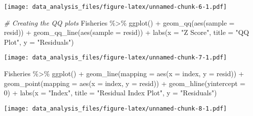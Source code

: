 \documentclass[
]{article}
\newenvironment{Shaded}{\begin{snugshade}}{\end{snugshade}}
\newcommand{\AttributeTok}[1]{\textcolor[rgb]{0.77,0.63,0.00}{#1}}
\newcommand{\CommentTok}[1]{\textcolor[rgb]{0.56,0.35,0.01}{\textit{#1}}}
\newcommand{\DecValTok}[1]{\textcolor[rgb]{0.00,0.00,0.81}{#1}}
\newcommand{\FunctionTok}[1]{\textcolor[rgb]{0.00,0.00,0.00}{#1}}
\newcommand{\NormalTok}[1]{#1}
\newcommand{\SpecialCharTok}[1]{\textcolor[rgb]{0.00,0.00,0.00}{#1}}
\newcommand{\StringTok}[1]{\textcolor[rgb]{0.31,0.60,0.02}{#1}}
\begin{document}
\texttt{[image: data\_analysis\_files/figure-latex/unnamed-chunk-6-1.pdf]}

\begin{Shaded}
\begin{Highlighting}[]
\CommentTok{\# Creating the QQ plots}
\NormalTok{Fisheries }\SpecialCharTok{\%\textgreater{}\%}
  \FunctionTok{ggplot}\NormalTok{() }\SpecialCharTok{+}
  \FunctionTok{geom\_qq}\NormalTok{(}\FunctionTok{aes}\NormalTok{(}\AttributeTok{sample =}\NormalTok{ resid)) }\SpecialCharTok{+}
  \FunctionTok{geom\_qq\_line}\NormalTok{(}\FunctionTok{aes}\NormalTok{(}\AttributeTok{sample =}\NormalTok{ resid)) }\SpecialCharTok{+}
  \FunctionTok{labs}\NormalTok{(}\AttributeTok{x =} \StringTok{"Z Score"}\NormalTok{,}
       \AttributeTok{title =} \StringTok{"QQ Plot"}\NormalTok{,}
       \AttributeTok{y =} \StringTok{"Residuals"}\NormalTok{)}
\end{Highlighting}
\end{Shaded}

\texttt{[image: data\_analysis\_files/figure-latex/unnamed-chunk-7-1.pdf]}

\begin{Shaded}
\begin{Highlighting}[]
\NormalTok{Fisheries }\SpecialCharTok{\%\textgreater{}\%}
  \FunctionTok{ggplot}\NormalTok{() }\SpecialCharTok{+}
  \FunctionTok{geom\_line}\NormalTok{(}\AttributeTok{mapping =} \FunctionTok{aes}\NormalTok{(}\AttributeTok{x =}\NormalTok{ index, }\AttributeTok{y =}\NormalTok{ resid)) }\SpecialCharTok{+}
  \FunctionTok{geom\_point}\NormalTok{(}\AttributeTok{mapping =} \FunctionTok{aes}\NormalTok{(}\AttributeTok{x =}\NormalTok{ index, }\AttributeTok{y =}\NormalTok{ resid)) }\SpecialCharTok{+}
  \FunctionTok{geom\_hline}\NormalTok{(}\AttributeTok{yintercept =} \DecValTok{0}\NormalTok{) }\SpecialCharTok{+}
  \FunctionTok{labs}\NormalTok{(}\AttributeTok{x =} \StringTok{"Index"}\NormalTok{,}
       \AttributeTok{title =} \StringTok{"Residual Index Plot"}\NormalTok{,}
       \AttributeTok{y =} \StringTok{"Residuals"}\NormalTok{)}
\end{Highlighting}
\end{Shaded}

\texttt{[image: data\_analysis\_files/figure-latex/unnamed-chunk-8-1.pdf]}
\end{document}
